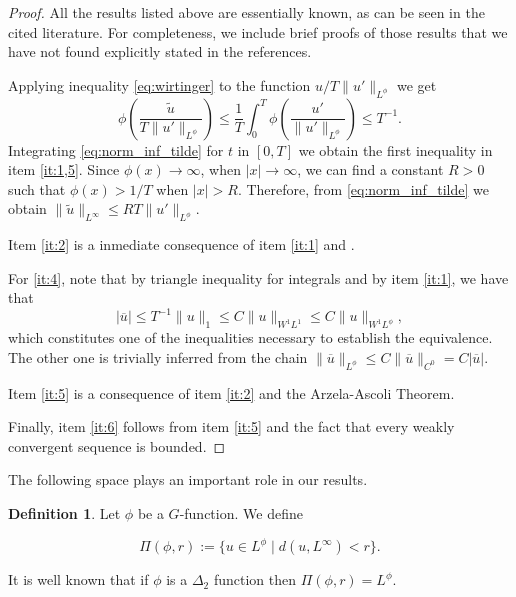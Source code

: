 \documentclass[twoside]{article}
\theoremstyle{definition}
\newtheorem{definition}{Definition}[section]
\theoremstyle{plain}
\theoremstyle{remark}
\newcommand{\orlnor}{\|_{L^{\phi}}}
\newcommand{\lphi}{L^{\phi}}
\newcommand{\sobnor}{\|_{W^{1}\lphi}}
\begin{document}
\begin{proof}All the results listed above are essentially known, as can be seen in the cited literature. For completeness, we include brief proofs of those results that we have not found explicitly stated in the references.

Applying inequality \eqref{eq:wirtinger} to the function $u/T\|u'\orlnor$ we get
\begin{equation}\label{eq:norm_inf_tilde}
 \phi\left(\frac{\tilde{u}}{T\|u'\orlnor}\right)\leq \frac{1}{T}\int_0^T\phi\left(\frac{u'}{\|u'\orlnor}\right)\leq T^{-1}.
\end{equation}
Integrating \eqref{eq:norm_inf_tilde} for $t$ in $[0,T]$ we obtain the first inequality in item   \ref{it:1,5}. Since $\phi(x)\to\infty$, when $|x|\to\infty$, we can find a constant $R>0$ such that $\phi(x)>1/T$ when $|x|>R$. Therefore, from \eqref{eq:norm_inf_tilde} we obtain $\|\tilde{u}\|_{L^\infty}\leq RT \|u'\orlnor$.

 Item \ref{it:2} is a inmediate consequence of item \ref{it:1} and    \cite[Th. 2.2]{buttazzo1998one}.

 For \ref{it:4}, note that by triangle inequality for integrals and by item \ref{it:1}, we have that
 $$
 |\overline{u}|\leq T^{-1}\|u\|_1 \leq C\|u\|_{W^1L^1}\leq C \|u\sobnor,
 $$
which constitutes one of the inequalities necessary to establish the equivalence. The other one is trivially inferred from the chain $\|\overline{u}\orlnor\leq C\|\overline{u}\|_{C^0}=C|\overline{u}|$.

Item \ref{it:5} is a consequence of item \ref{it:2} and the Arzela-Ascoli Theorem.

Finally, item  \ref{it:6} follows from item \ref{it:5} and the fact that every weakly convergent sequence is bounded.
\end{proof}


The following space plays an important role in our results.

\begin{definition}\label{def:Pi} Let $\phi$ be a $G$-function. We define

\[\Pi(\phi, r):=\{u \in L^\phi \mid d(u,L^\infty)<r\}.\]

\end{definition}

It is well known that if $\phi$ is a $\Delta_2$ function then $\Pi(\phi, r)= L^\phi$.
\end{document}
